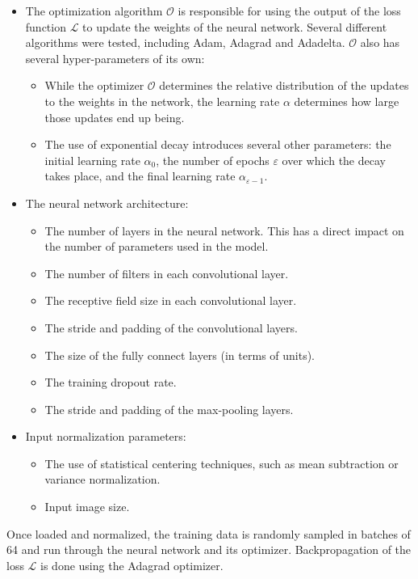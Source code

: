 \documentclass[12pt]{article}
\begin{document}
\begin{itemize}
	\item The optimization algorithm $\mathcal{O}$ is responsible for using the output of the loss function $\mathcal{L}$ to update the weights of the neural network. Several different algorithms were tested, including Adam, Adagrad and Adadelta. $\mathcal{O}$ also has several hyper-parameters of its own:
	\begin{itemize}
	\item While the optimizer $\mathcal{O}$ determines the relative distribution of the updates to the weights in the network, the learning rate $\alpha$ determines how large those updates end up being.
	\item The use of exponential decay introduces several other parameters: the initial learning rate $\alpha_0$, the number of epochs $\varepsilon$ over which the decay takes place, and the final learning rate $\alpha_{\varepsilon-1}$.
	\end{itemize}

	\item The neural network architecture:
	\begin{itemize}
		\item The number of layers in the neural network. This has a direct impact on the number of parameters used in the model.
		\item The number of filters in each convolutional layer.
		\item The receptive field size in each convolutional layer.
		\item The stride and padding of the convolutional layers.
		\item The size of the fully connect layers (in terms of units).
		\item The training dropout rate.
		\item The stride and padding of the max-pooling layers.
	\end{itemize}

	\item Input normalization parameters:
	\begin{itemize}
		\item The use of statistical centering techniques, such as mean subtraction or variance normalization.
		\item Input image size.
	\end{itemize}
\end{itemize}

Once loaded and normalized, the training data is randomly sampled in batches of 64 and run through the neural network and its optimizer.
Backpropagation of the loss $\mathcal{L}$ is done using the Adagrad optimizer.
\end{document}
